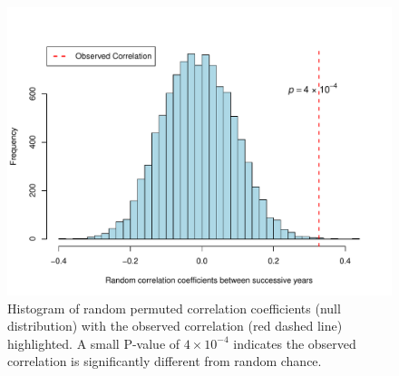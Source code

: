 \documentclass{article}
\begin{document}
\centering
\begin{figure}[H]
    \centering
    \includegraphics[width=0.9\linewidth]{../data/Coefficients.pdf}
    \vspace{2em}
\caption{Histogram of random permuted correlation coefficients (null distribution) with the observed correlation (red dashed line) highlighted. A small P-value of $4 \times 10^{-4}$ indicates the observed correlation is significantly different from random chance.}
    \label{fig:label2}
\end{figure}
\end{document}
